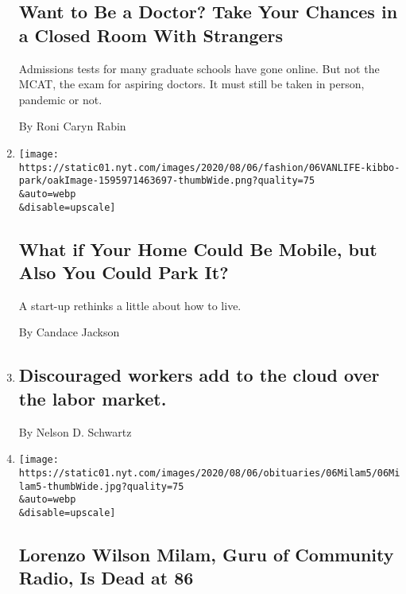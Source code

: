 \begin{enumerate}
{  \subsection{Want to Be a Doctor? Take Your Chances in a Closed Room
  With
  Strangers}\label{want-to-be-a-doctor-take-your-chances-in-a-closed-room-with-strangers}}

  Admissions tests for many graduate schools have gone online. But not
  the MCAT, the exam for aspiring doctors. It must still be taken in
  person, pandemic or not.

  By Roni Caryn Rabin
\item
  \href{/2020/08/07/style/kibbo-van-life-startup.html}{}

  \texttt{[image: https://static01.nyt.com/images/2020/08/06/fashion/06VANLIFE-kibbo-park/oakImage-1595971463697-thumbWide.png?quality=75\\\&auto=webp\\\&disable=upscale]}

  \hypertarget{what-if-your-home-could-be-mobile-but-also-you-could-park-it}{%
  \subsection{What if Your Home Could Be Mobile, but Also You Could Park
  It?}\label{what-if-your-home-could-be-mobile-but-also-you-could-park-it}}

  A start-up rethinks a little about how to live.

  By Candace Jackson
\item
  \href{/2020/08/07/business/discouraged-workers-add-to-the-cloud-over-the-labor-market.html}{}

  \hypertarget{discouraged-workers-add-to-the-cloud-over-the-labor-market}{%
  \subsection{Discouraged workers add to the cloud over the labor
  market.}\label{discouraged-workers-add-to-the-cloud-over-the-labor-market}}

  By Nelson D. Schwartz
\item
  \href{/2020/08/07/business/media/lorenzo-milam-dead.html}{}

  \texttt{[image: https://static01.nyt.com/images/2020/08/06/obituaries/06Milam5/06Milam5-thumbWide.jpg?quality=75\\\&auto=webp\\\&disable=upscale]}

  \hypertarget{lorenzo-wilson-milam-guru-of-community-radio-is-dead-at-86}{%
  \subsection{Lorenzo Wilson Milam, Guru of Community Radio, Is Dead at
  86}\label{lorenzo-wilson-milam-guru-of-community-radio-is-dead-at-86}}


\end{enumerate}
